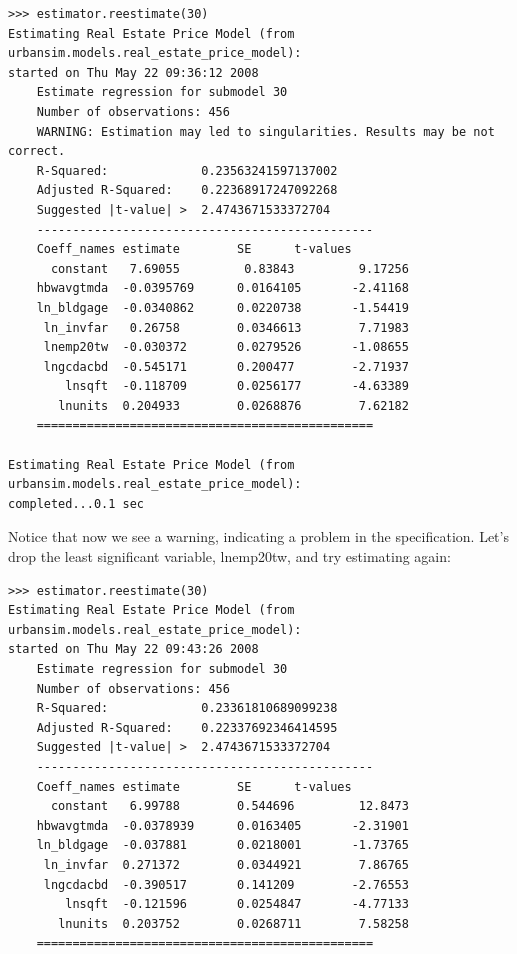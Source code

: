 \begin{verbatim}
>>> estimator.reestimate(30)
Estimating Real Estate Price Model (from urbansim.models.real_estate_price_model): 
started on Thu May 22 09:36:12 2008
    Estimate regression for submodel 30
    Number of observations: 456
    WARNING: Estimation may led to singularities. Results may be not correct.
    R-Squared:             0.23563241597137002
    Adjusted R-Squared:    0.22368917247092268
    Suggested |t-value| >  2.4743671533372704
    -----------------------------------------------
    Coeff_names estimate        SE      t-values
      constant   7.69055         0.83843         9.17256
    hbwavgtmda  -0.0395769      0.0164105       -2.41168
    ln_bldgage  -0.0340862      0.0220738       -1.54419
     ln_invfar   0.26758        0.0346613        7.71983
     lnemp20tw  -0.030372       0.0279526       -1.08655
     lngcdacbd  -0.545171       0.200477        -2.71937
        lnsqft  -0.118709       0.0256177       -4.63389
       lnunits  0.204933        0.0268876        7.62182
    ===============================================

Estimating Real Estate Price Model (from urbansim.models.real_estate_price_model): 
completed...0.1 sec
\end{verbatim}

Notice that now we see a warning, indicating a problem in
the specification.  Let's drop the least significant
variable, lnemp20tw, and try estimating again:

\begin{verbatim}
>>> estimator.reestimate(30)
Estimating Real Estate Price Model (from urbansim.models.real_estate_price_model): 
started on Thu May 22 09:43:26 2008
    Estimate regression for submodel 30
    Number of observations: 456
    R-Squared:             0.23361810689099238
    Adjusted R-Squared:    0.22337692346414595
    Suggested |t-value| >  2.4743671533372704
    -----------------------------------------------
    Coeff_names estimate        SE      t-values
      constant   6.99788        0.544696         12.8473
    hbwavgtmda  -0.0378939      0.0163405       -2.31901
    ln_bldgage  -0.037881       0.0218001       -1.73765
     ln_invfar  0.271372        0.0344921        7.86765
     lngcdacbd  -0.390517       0.141209        -2.76553
        lnsqft  -0.121596       0.0254847       -4.77133
       lnunits  0.203752        0.0268711        7.58258
    ===============================================
\end{verbatim}

